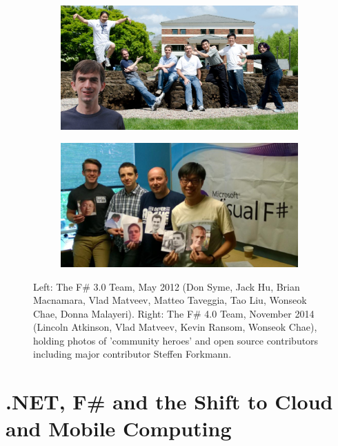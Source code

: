 \documentclass[acmsmall]{acmart}\settopmatter{}
\begin{document}
\begin{figure}

  \centering
  \begin{subfigure}[b]{0.44\linewidth}
    \includegraphics[width=\linewidth]{team-2012.jpg}
  \end{subfigure}
  \begin{subfigure}[b]{0.44\linewidth}
    \includegraphics[width=\linewidth]{team-2014.png}
  \end{subfigure}
   \caption{Left: The F\# 3.0 Team, May 2012 (Don Syme, Jack Hu, Brian Macnamara, Vlad Matveev, Matteo Taveggia, Tao Liu, Wonseok Chae, Donna Malayeri).
Right: The F\# 4.0 Team, November 2014  (Lincoln Atkinson, Vlad Matveev, Kevin Ransom, Wonseok Chae), holding photos of 'community heroes' and open source contributors
including major contributor Steffen Forkmann.}
  \label{fig:team-2012-2014}

\end{figure}




\section*{.NET, F\# and the Shift to Cloud and Mobile Computing}
\end{document}
